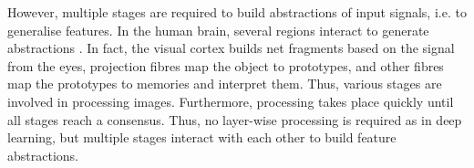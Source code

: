 However, multiple stages are required to build abstractions of input signals, i.e. to generalise features.
In the human brain, several regions interact to generate abstractions .
In fact, the visual cortex builds net fragments based on the signal from the eyes, projection fibres map the object to prototypes, and other fibres map the prototypes to memories and interpret them. Thus, various stages are involved in processing images.
Furthermore, processing takes place quickly until all stages reach a consensus. Thus, no layer-wise processing is required as in deep learning, but multiple stages interact with each other to build feature abstractions.

